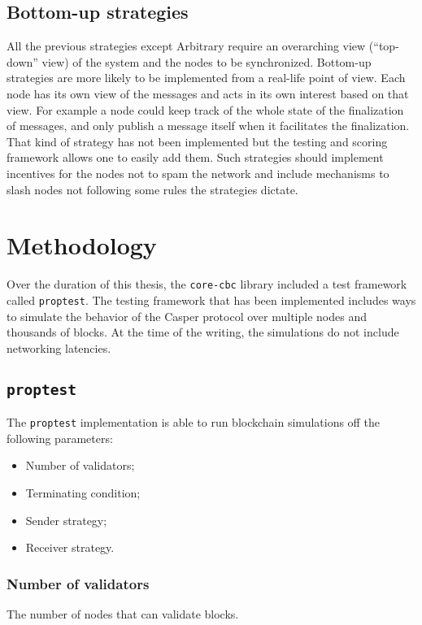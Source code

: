 \subsection{Bottom-up strategies}
\label{ssec:bottomUpStrats}
All the previous strategies except Arbitrary require an overarching view
(``top-down'' view) of the system and the nodes to be synchronized.
Bottom-up strategies are more likely to be implemented from a real-life point of
view. Each node has its own view of the messages and acts in its own interest
based on that view.
For example a node could keep track of the whole state of the finalization of
messages, and only publish a message itself when it facilitates the
finalization. That kind of strategy has not been implemented but the testing and
scoring framework allows one to easily add them.
Such strategies should implement incentives for the nodes not to spam the
network and include mechanisms to slash nodes not following some rules the
strategies dictate.

\section{Methodology}
Over the duration of this thesis, the \texttt{core-cbc} library included a
test framework called \texttt{proptest}. The testing framework that has been
implemented includes ways to simulate the behavior of the Casper protocol over
multiple nodes and thousands of blocks. At the time of the
writing, the simulations do not include networking latencies.

\subsection{\texttt{proptest}}
\label{ssec:proptest}

The \texttt{proptest} implementation is able to run blockchain simulations off
the following parameters:
\begin{itemize}
    \item Number of validators;
    \item Terminating condition;
    \item Sender strategy;
    \item Receiver strategy.
\end{itemize}

\subsubsection{Number of validators}
The number of nodes that can validate blocks.

